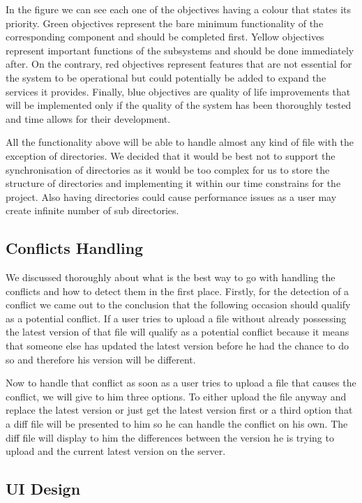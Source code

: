 \documentclass[11pt]{article}
\begin{document}
In the figure we can see each one of the objectives having a colour that states its priority. Green objectives represent the bare minimum functionality of the corresponding component and should be completed first. Yellow objectives represent important functions of the subsystems and should be done immediately after. On the contrary, red objectives represent features that are not essential for the system to be operational but could potentially be added to expand the services it provides. Finally, blue objectives are quality of life improvements that will be implemented only if the quality of the system has been thoroughly tested and time allows for their development.

All the functionality above will be able to handle almost any kind of file with the exception of directories. We decided that it would be best not to support the synchronisation of directories as it would be too complex for us to store the structure of directories and implementing it within our time constrains for the project. Also having directories could cause performance issues as a user may create infinite number of sub directories.

\subsection{Conflicts Handling}

We discussed thoroughly about what is the best way to go with handling the conflicts and how to detect them in the first place. Firstly, for the detection of a conflict we came out to the conclusion that the following occasion should qualify as a potential conflict. If a user tries to upload a file without already possessing the latest version of that file will qualify as a potential conflict because it means that someone else has updated the latest version before he had the chance to do so and therefore his version will be different.

Now to handle that conflict as soon as a user tries to upload a file that causes the conflict, we will give to him three options. To either upload the file anyway and replace the latest version or just get the latest version first or a third option that a diff file will be presented to him so he can handle the conflict on his own. The diff file will display to him the differences between the version he is trying to upload and the current latest version on the server.

\subsection{UI Design}
\end{document}
